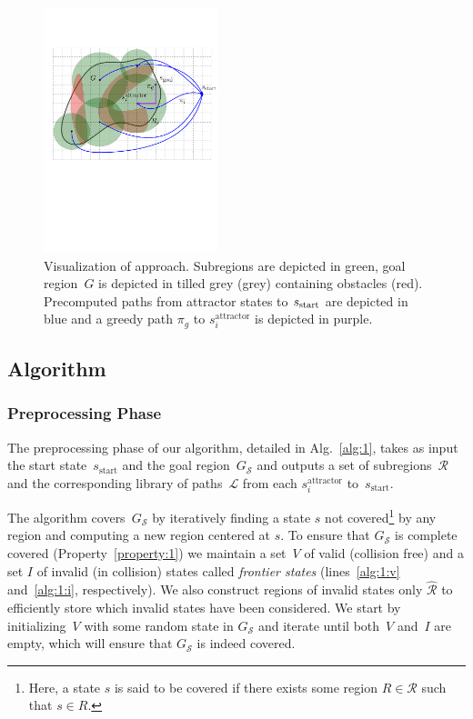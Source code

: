 \documentclass[letterpaper]{article} %
\newcommand{\calL}{\ensuremath{\mathcal{L}}\xspace}
\newcommand{\calS}{\ensuremath{\mathcal{S}}\xspace}
\newcommand{\calR}{\ensuremath{\mathcal{R}}\xspace}
\newcommand{\sAttract}{\ensuremath{s^{\text{attractor}}_i}\xspace}
\newcommand{\sStart}{\ensuremath{s_{\text{start}}\xspace}}
\begin{document}
\begin{figure}
\centering
\includegraphics[width=0.45\textwidth]{Approach.pdf}
  \caption{
  Visualization of approach. Subregions are depicted in green, 
  goal region~$G$ is depicted in tilled grey (grey) containing obstacles (red).
  Precomputed paths from attractor states to $s_{\rm{start}}$ are depicted in blue and a greedy path $\pi_g$ to \sAttract is depicted in purple. 
}
   	\label{fig:approach}
\end{figure}

\subsection {Algorithm}
\label{subsec:alg}
\subsubsection{Preprocessing Phase}
The preprocessing phase of our algorithm, detailed in Alg.~\ref{alg:1}, takes as input the start state~$\sStart$ and the goal region~$G_\calS$ and outputs a set of subregions~$\calR$ and the corresponding library of paths~$\calL$ from each \sAttract to~\sStart. 

The algorithm covers~$G_\calS$ by iteratively finding a state $s$ not covered\footnote{Here, a state $s$ is said to be covered if there exists some region $R \in \calR$ such that $s \in R$.} by any region and computing a new region centered at $s$.
To ensure that $G_\calS$ is complete covered (Property~\ref{property:1}) we maintain a set~$V$ of valid (collision free) and a set $I$ of invalid (in collision) states called \emph{frontier states} (lines~\ref{alg:1:v} and~\ref{alg:1:i}, respectively).
We also construct regions of invalid states only $\hat{\calR}$ to efficiently store which invalid states have been considered.
We start by initializing~$V$ with some random state in $G_\calS$ and iterate until both~$V$ and~$I$ are empty, which will ensure that $G_\calS$ is indeed covered.
\end{document}
